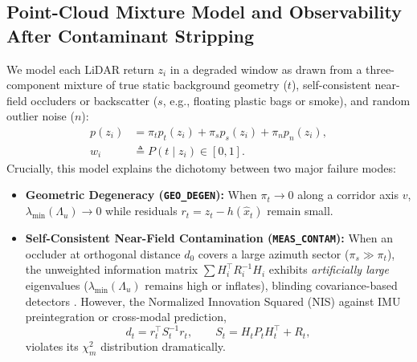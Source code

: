 \documentclass[journal]{IEEEtran}
\begin{document}
\subsection{Point-Cloud Mixture Model and Observability After Contaminant Stripping}
We model each LiDAR return $z_i$ in a degraded window as drawn from a three-component mixture of true static background geometry ($t$), self-consistent near-field occluders or backscatter ($s$, e.g., floating plastic bags or smoke), and random outlier noise ($n$):
\begin{equation}
\begin{split}
    p(z_i) &= \pi_t p_t(z_i) + \pi_s p_s(z_i) + \pi_n p_n(z_i), \\
    w_i &\triangleq P(t \mid z_i) \in [0,1].
\end{split}
\end{equation}
Crucially, this model explains the dichotomy between two major failure modes:
\begin{itemize}
    \item \textbf{Geometric Degeneracy (\texttt{GEO\_DEGEN}):} When $\pi_t \to 0$ along a corridor axis $v$, $\lambda_{\min}(\Lambda_u) \to 0$ while residuals $r_t = z_t - h(\hat{x}_t)$ remain small.
    \item \textbf{Self-Consistent Near-Field Contamination (\texttt{MEAS\_CONTAM}):} When an occluder at orthogonal distance $d_0$ covers a large azimuth sector ($\pi_s \gg \pi_t$), the unweighted information matrix $\sum H_i^\top R_i^{-1} H_i$ exhibits \emph{artificially large} eigenvalues ($\lambda_{\min}(\Lambda_u)$ remains high or inflates), blinding covariance-based detectors \cite{ma2025mmlins,zhang2016degeneracy}. However, the Normalized Innovation Squared (NIS) against IMU preintegration or cross-modal prediction,
    \begin{equation}
        d_t = r_t^\top S_t^{-1} r_t, \qquad S_t = H_t P_t H_t^\top + R_t,
    \end{equation}
    violates its $\chi^2_m$ distribution dramatically.
\end{itemize}
\end{document}
